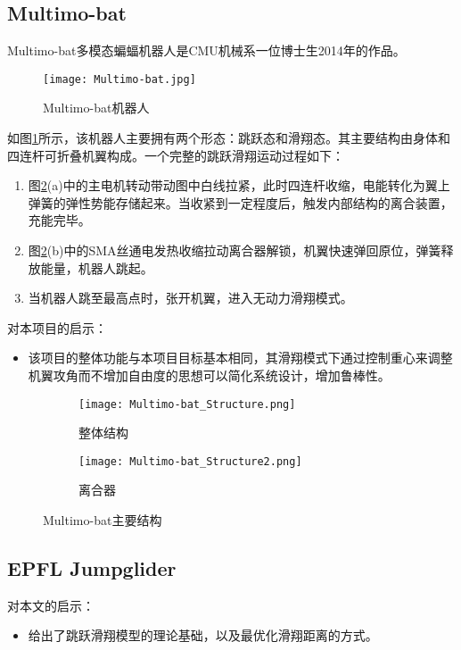 \subsection{Multimo-bat}
Multimo-bat多模态蝙蝠机器人是CMU机械系一位博士生2014年的作品。  
\begin{figure}[H]
  \centering
  \texttt{[image: Multimo-bat.jpg]}
  \caption{Multimo-bat机器人\cite{multimo}}
  \label{fig:multimo}
\end{figure}
如图\ref{fig:multimo}所示，该机器人主要拥有两个形态：跳跃态和滑翔态。其主要结构由身体和四连杆可折叠机翼构成。一个完整的跳跃滑翔运动过程如下：
\begin{enumerate}
  \item 图\ref{fig:multimo_struct}(a)中的主电机转动带动图中白线拉紧，此时四连杆收缩，电能转化为翼上弹簧的弹性势能存储起来。当收紧到一定程度后，触发内部结构的离合装置，充能完毕。
  \item 图\ref{fig:multimo_struct}(b)中的SMA丝通电发热收缩拉动离合器解锁，机翼快速弹回原位，弹簧释放能量，机器人跳起。
  \item 当机器人跳至最高点时，张开机翼，进入无动力滑翔模式。
\end{enumerate}
对本项目的启示：
\begin{itemize}
  \item 该项目的整体功能与本项目目标基本相同，其滑翔模式下通过控制重心来调整机翼攻角而不增加自由度的思想可以简化系统设计，增加鲁棒性。
\end{itemize}
\begin{figure}[h]
  \centering%
  \begin{subfigure}{3cm}
    \texttt{[image: Multimo-bat\_Structure.png]}
    \caption{整体结构}
  \end{subfigure}%
  \hspace{10em}%
  \begin{subfigure}{0.5\textwidth}
    \texttt{[image: Multimo-bat\_Structure2.png]}
    \caption{离合器}
  \end{subfigure}
  \caption{Multimo-bat主要结构\cite{multimo}}
  \label{fig:multimo_struct}
\end{figure}

\subsection{EPFL Jumpglider}


对本文的启示：
\begin{itemize}
  \item 给出了跳跃滑翔模型的理论基础，以及最优化滑翔距离的方式。
\end{itemize}